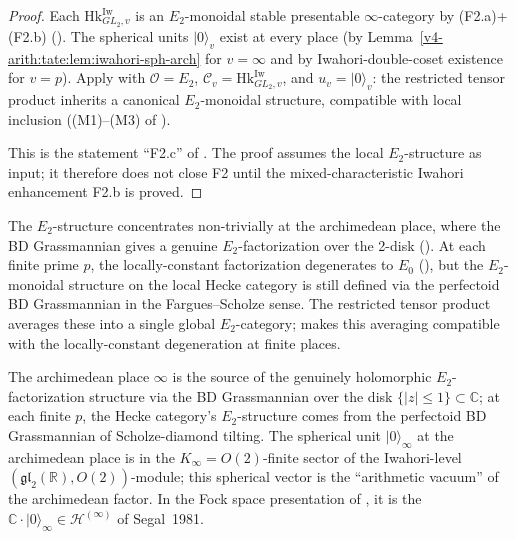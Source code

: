 \begin{proof}
Each \(\mathrm{Hk}^{\mathrm{Iw}}_{GL_{2},v}\) is an \(E_{2}\)-monoidal
stable presentable \(\infty\)-category by (F2.a)+(F2.b)
(). The spherical units
\(|0\rangle_{v}\) exist at every place (by
Lemma~\ref{v4-arith:tate:lem:iwahori-sph-arch} for \(v=\infty\) and
by Iwahori-double-coset existence for \(v=p\)). Apply
 with \(\mathcal{O}=E_{2}\),
\(\mathcal{C}_{v}=\mathrm{Hk}^{\mathrm{Iw}}_{GL_{2},v}\), and
\(u_{v}=|0\rangle_{v}\): the restricted tensor product inherits a
canonical \(E_{2}\)-monoidal structure, compatible with local
inclusion ((M1)--(M3) of ).

This is the statement ``F2.c'' of
. The proof assumes the local
\(E_{2}\)-structure as input; it therefore does not close F2 until
the mixed-characteristic Iwahori enhancement F2.b is proved.
\end{proof}

\begin{remark}
\label{v4-arith:tate:rem:archimedean-vs-finite-E2}
The \(E_{2}\)-structure concentrates non-trivially at the archimedean
place, where the BD Grassmannian gives a genuine \(E_{2}\)-factorization
over the 2-disk (). At each finite
prime \(p\), the locally-constant factorization degenerates to
\(E_{0}\) (), but the
\(E_{2}\)-monoidal structure on the local Hecke category is still
defined via the perfectoid BD Grassmannian in the Fargues--Scholze
sense. The restricted tensor product averages these into a single
global \(E_{2}\)-category;
 makes this averaging
compatible with the locally-constant degeneration at finite places.
\end{remark}

\begin{remark}
\label{v4-arith:tate:rem:archimedean}
The archimedean place \(\infty\) is the source of the genuinely
holomorphic \(E_{2}\)-factorization structure via the BD Grassmannian
over the disk \(\{|z|\leq 1\}\subset\mathbb{C}\); at each finite
\(p\), the Hecke category's \(E_{2}\)-structure comes from the
perfectoid BD Grassmannian of Scholze-diamond tilting. The spherical
unit \(|0\rangle_{\infty}\) at the archimedean place is in the
\(K_{\infty}=O(2)\)-finite sector of the Iwahori-level
\((\mathfrak{gl}_{2}(\mathbb{R}),O(2))\)-module; this spherical vector
is the ``arithmetic vacuum'' of the archimedean factor.
In the Fock space presentation of
, it is the
\(\mathbb{C}\cdot|0\rangle_{\infty}\in\mathcal{H}^{(\infty)}\) of
Segal~1981.
\end{remark}

